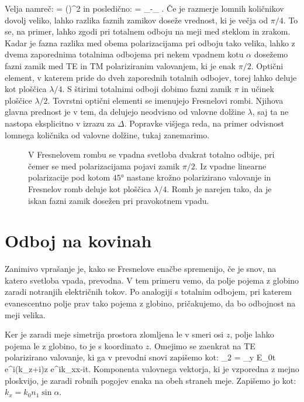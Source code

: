 Velja namreč:
\beq
\tan {} = \left(\right)^2 \tan {}
\label{eq:04_87}
\eeq
in posledično:
\beq
\Delta = \delta_-\delta_ .
\label{eq:04_88}
\eeq
Če je razmerje lomnih količnikov dovolj veliko, lahko razlika faznih zamikov doseže vrednost, ki je
večja od $\pi/4$. To se, na primer, lahko zgodi pri totalnem odboju na meji med steklom in zrakom. 
Kadar je fazna razlika med obema polarizacijama pri odboju tako velika, lahko  z dvema zaporednima
totalnima odbojema pri nekem vpadnem kotu $\alpha$
dosežemo fazni zamik med TE in TM polariziranim valovanjem, ki je enak $\pi/2$. 
Optični element, v katerem pride do dveh zaporednih totalnih odbojev, torej lahko deluje kot ploščica
$\lambda/4$. S štirimi totalnimi odboji dobimo fazni zamik $\pi$ in učinek ploščice $\lambda/2$. Tovrstni optični elementi se imenujejo Fresnelovi rombi. 
Njihova glavna prednost je v tem, da delujejo neodvisno od 
valovne dolžine $\lambda$, saj ta ne nastopa eksplicitno v izrazu za $\Delta$. Popravke 
višjega reda, na primer odvisnost lomnega količnika od valovne dolžine, tukaj zanemarimo.
\begin{figure}[ht]
\centering
\def\svgwidth{70truemm} 

\caption{V Fresnelovem rombu se vpadna svetloba dvakrat totalno odbije, pri čemer
se med polarizacijama pojavi zamik $\pi/2$. Iz vpadne linearne polarizacije pod kotom 
$45\si{\degree}$ nastane krožno polarizirano valovanje in Fresnelov romb deluje 
kot ploščica $\lambda/4$. Romb je narejen tako, da je iskan fazni 
zamik dosežen pri pravokotnem vpadu.}
\label{fig:04_Fresneltot}
\end{figure}

\section{Odboj na kovinah}
Zanimivo vprašanje je, kako se Fresnelove enačbe spremenijo, če je snov, 
na katero svetloba vpada, prevodna. V tem primeru
vemo, da polje pojema z globino zaradi notranjih električnih tokov. 
Po analogiji s totalnim odbojem, pri katerem evanescentno polje prav tako
pojema z globino, pričakujemo, da bo odbojnost na meji velika. 

Ker je zaradi meje simetrija prostora zlomljena le v smeri osi $z$, polje
lahko pojema le z globino, to je s koordinato $z$. 
Omejimo se zaenkrat na TE polarizirano valovanje, ki 
ga v prevodni snovi zapišemo kot:
\beq
{}_2 = _y E_{0t} e^{i(k_z+i\varkappa)z} e^{ik_xx-i\omega t}.
\label{eq:04_89}
\eeq
Komponenta valovnega vektorja, ki je vzporedna z mejno ploskvijo, je zaradi
robnih pogojev enaka na obeh straneh meje. Zapišemo jo kot: $k_x = k_0 n_1 \sin \alpha$. 

